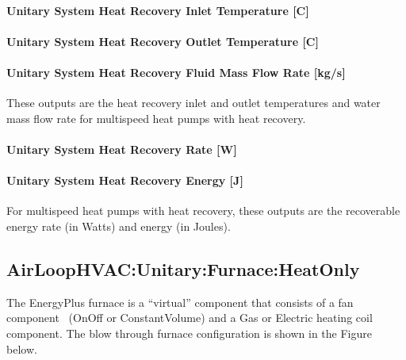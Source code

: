 \paragraph{Unitary System Heat Recovery Inlet Temperature {[}C{]}}\label{unitary-system-heat-recovery-inlet-temperature-c-1}

\paragraph{Unitary System Heat Recovery Outlet Temperature {[}C{]}}\label{unitary-system-heat-recovery-outlet-temperature-c-1}

\paragraph{Unitary System Heat Recovery Fluid Mass Flow Rate {[}kg/s{]}}\label{unitary-system-heat-recovery-fluid-mass-flow-rate-kgs-1}

These outputs are the heat recovery inlet and outlet temperatures and water mass flow rate for multispeed heat pumps with heat recovery.

\paragraph{Unitary System Heat Recovery Rate {[}W{]}}\label{unitary-system-heat-recovery-rate-w-1}

\paragraph{Unitary System Heat Recovery Energy {[}J{]}}\label{unitary-system-heat-recovery-energy-j-1}

For multispeed heat pumps with heat recovery, these outputs are the recoverable energy rate (in Watts) and energy (in Joules).

\subsection{AirLoopHVAC:Unitary:Furnace:HeatOnly}\label{airloophvacunitaryfurnaceheatonly}

The EnergyPlus furnace is a ``virtual'' component that consists of a fan component~ (OnOff or ConstantVolume) and a Gas or Electric heating coil component. The blow through furnace configuration is shown in the Figure below.

